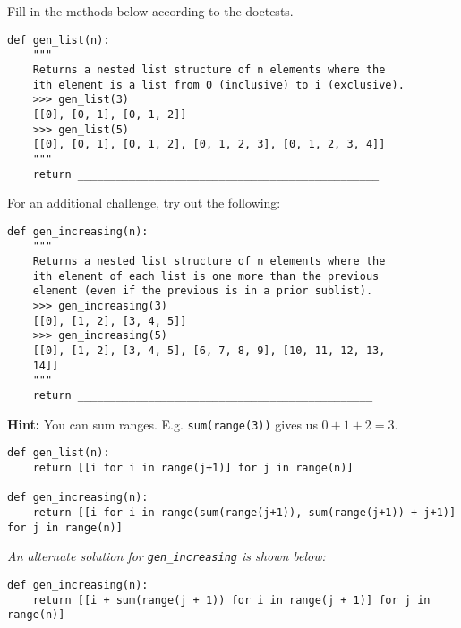 \begin{blocksection}
\question Fill in the methods below according to the doctests.
\end{blocksection}

\begin{lstlisting}
def gen_list(n):
    """
    Returns a nested list structure of n elements where the 
    ith element is a list from 0 (inclusive) to i (exclusive).
    >>> gen_list(3)
    [[0], [0, 1], [0, 1, 2]]
    >>> gen_list(5)
    [[0], [0, 1], [0, 1, 2], [0, 1, 2, 3], [0, 1, 2, 3, 4]]
    """
    return _______________________________________________
\end{lstlisting}

For an additional challenge, try out the following:

\begin{lstlisting}
def gen_increasing(n):
    """
    Returns a nested list structure of n elements where the 
    ith element of each list is one more than the previous 
    element (even if the previous is in a prior sublist).
    >>> gen_increasing(3)
    [[0], [1, 2], [3, 4, 5]]
    >>> gen_increasing(5)
    [[0], [1, 2], [3, 4, 5], [6, 7, 8, 9], [10, 11, 12, 13, 
    14]]
    """
    return ______________________________________________
\end{lstlisting}

\textbf{Hint:} You can sum ranges. E.g. \texttt{sum(range(3))} gives us $0 + 1 + 2 = 3$.

\begin{solution}
\begin{lstlisting}
def gen_list(n):
    return [[i for i in range(j+1)] for j in range(n)]

def gen_increasing(n):
    return [[i for i in range(sum(range(j+1)), sum(range(j+1)) + j+1)] for j in range(n)]
\end{lstlisting}

\textit{An alternate solution for \texttt{gen\_increasing} is shown below:}

\begin{lstlisting}
def gen_increasing(n):
    return [[i + sum(range(j + 1)) for i in range(j + 1)] for j in range(n)]
\end{lstlisting}
\end{solution}
